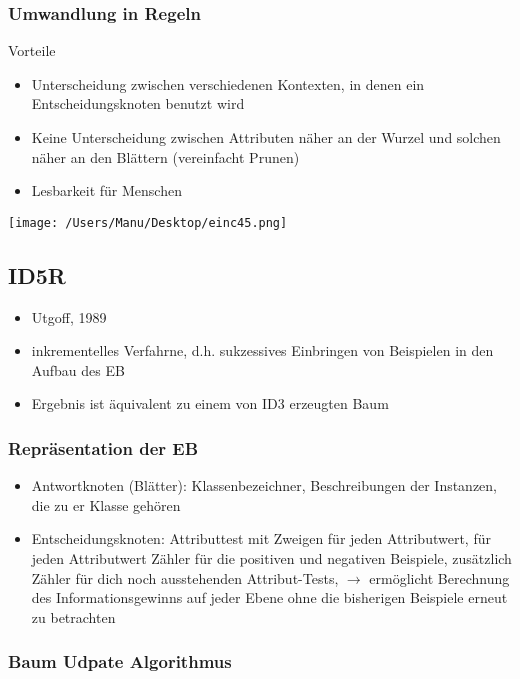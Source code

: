 \documentclass[paper=a4, fontsize=11pt]{scrartcl} %
\numberwithin{equation}{section} %
\numberwithin{figure}{section} %
\numberwithin{table}{section} %
\begin{document}
\subsubsection{Umwandlung in Regeln}

Vorteile
\begin{itemize}
\item Unterscheidung zwischen verschiedenen Kontexten, in denen ein Entscheidungsknoten benutzt wird
\item Keine Unterscheidung zwischen Attributen näher an der Wurzel und solchen näher an den Blättern (vereinfacht Prunen)
\item Lesbarkeit für Menschen
\end{itemize}

\texttt{[image: /Users/Manu/Desktop/einc45.png]}

\subsection{ID5R}

\begin{itemize}
\item Utgoff, 1989
\item inkrementelles Verfahrne, d.h. sukzessives Einbringen von Beispielen in den Aufbau des EB
\item Ergebnis ist äquivalent zu einem von ID3 erzeugten Baum
\end{itemize}

\subsubsection{Repräsentation der EB}

\begin{itemize}
\item Antwortknoten (Blätter): Klassenbezeichner, Beschreibungen der Instanzen, die zu er Klasse gehören
\item Entscheidungsknoten: Attributtest mit Zweigen für jeden Attributwert, für jeden Attributwert Zähler für die positiven und negativen Beispiele, zusätzlich Zähler für dich noch ausstehenden Attribut-Tests, $\rightarrow$ ermöglicht Berechnung des Informationsgewinns auf jeder Ebene ohne die bisherigen Beispiele erneut zu betrachten
\end{itemize}

\subsubsection{Baum Udpate Algorithmus}
\end{document}
